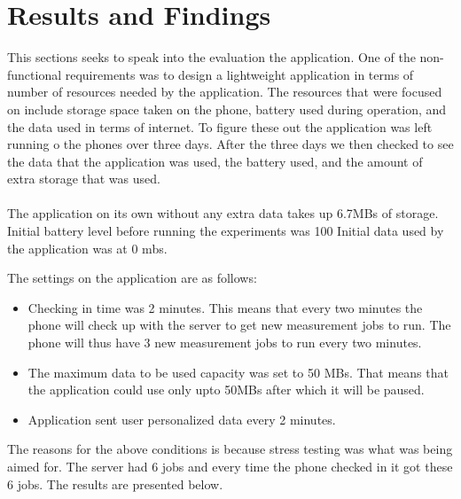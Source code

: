 \section{Results and Findings}\label{sec:results-and-findings}
This sections seeks to speak into the evaluation the application.
One of the non-functional requirements was to design a lightweight application in terms of number of resources needed by the application.
The resources that were focused on include storage space taken on the phone, battery used during operation, and the data used in terms of internet.
To figure these out the application was left running o the phones over three days.
After the three days we then checked to see the data that the application was used, the battery used, and the amount of extra storage that was used.

\paragraph{}
The application on its own without any extra data takes up 6.7MBs of storage.
Initial battery level before running the experiments was 100%
Initial data used by the application was at 0 mbs.

The settings on the application are as follows:
\begin{itemize}
    \item Checking in time was 2 minutes.
    This means that every two minutes the phone will check up with the server to get new measurement jobs to run.
    The phone will thus have 3 new measurement jobs to run every two minutes.
    \item The maximum data to be used capacity was set to 50 MBs.
    That means that the application could use only upto 50MBs after which it will be paused.
    \item Application sent user personalized data every 2 minutes.
\end{itemize}
The reasons for the above conditions is because stress testing was what was being aimed for.
The server had 6 jobs and every time the phone checked in it got these 6 jobs.
The results are presented below.

